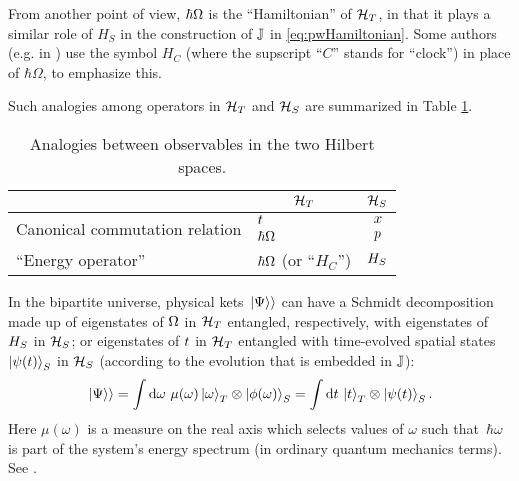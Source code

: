 From another point of view, $\hbar{\Omega}$ is the ``Hamiltonian'' of $\mathcal{H}_T$,
in that it plays a similar role of $H_S$ in the construction of
${\mathbb{J}}$ in \eqref{eq:pwHamiltonian}. Some authors (e.g. in \citereset\cite{Wootters:Loyola})
use the symbol $H_C$ (where the supscript ``$C$'' stands for ``clock'') in place of $\hbar\Omega$, to emphasize this.

Such analogies among operators in $\mathcal{H}_T$ and $\mathcal{H}_S$ are summarized in Table \ref{tbl:op_comparison_pw}.

{
  \begin{table}
    \centering
    \begin{tabular}{l|l|c}
      & \multicolumn{1}{c|}{$\mathcal{H}_T$}   & \multicolumn{1}{|c}{$\mathcal{H}_S$}   \\
      \hline
      \multirow{2}{11em}{Canonical commutation relation} 
      & ${t}$                            & ${x}$                            \\
      & $\hbar{\Omega}$                  & ${p}$                            \\
      \hline
      ``Energy operator''
      & $\hbar{\Omega}$ (or ``$H_C$'')   & ${H_S}$
    \end{tabular}
    {\caption{
      Analogies between observables in the two Hilbert spaces.
    }\label{tbl:op_comparison_pw}}
  \end{table}
}


In the bipartite universe, physical kets $\left.\left| \Psi \right\rangle\right\rangle$ can have a Schmidt decomposition
made up of
eigenstates of ${\Omega}$ in $\mathcal{H}_T$
entangled, respectively, with
eigenstates of ${H}_S$ in $\mathcal{H}_S$;
or eigenstates of ${t}$ in $\mathcal{H}_T$
entangled with time-evolved spatial states~$\ket{\psi(t)}_S$ in $\mathcal{H}_S$
(according to the evolution that is embedded in ${\mathbb{J}}$):
\begin{equation}\label{eq:pw:time_freq_mu}
  \left.\left| \Psi \right\rangle\right\rangle =
    \int \dd{\omega} \, \mu(\omega) \ket{\omega}_{T}\otimes\ket{\phi(\omega)}_{S} =
    \int \dd{t} \, \ket{t}_{T} \otimes \ket{\psi(t)}_{S} \text{.}
\end{equation}
Here $\mu(\omega)$ is a measure on the real axis which selects
values of $\omega$ such that~$\hbar\omega$ is part of the system's energy spectrum
(in ordinary quantum mechanics terms). See \cite[eq. (10)]{Lloyd:Time}.


